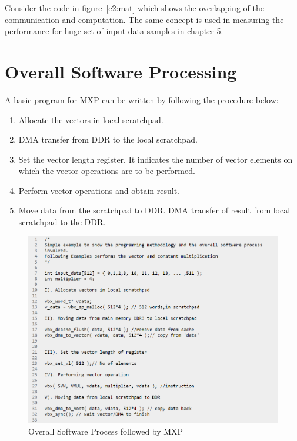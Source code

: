 Consider the code in figure~\ref{c2:mat} which shows the overlapping of the communication and computation.
The same concept is used in measuring the performance for huge set of input data samples in chapter 5.


\section{Overall Software Processing}
A basic program for MXP can be written by following the procedure below:

\begin{enumerate}

	\item Allocate the vectors in local scratchpad.

	\item DMA transfer from DDR to the local scratchpad.

	\item Set the vector length register. It indicates the number of vector elements on which the vector operations are to be performed.

	\item Perform vector operations and obtain result.

	\item Move data from the scratchpad to DDR. DMA transfer of result from local scratchpad to the DDR.

\end{enumerate}

\begin{figure}
	\centering
	\includegraphics[width=.9\textwidth]{images/MXPProcess.png}
	\caption{Overall Software Process followed by MXP}
	\label{c3:mat}
\end{figure}



